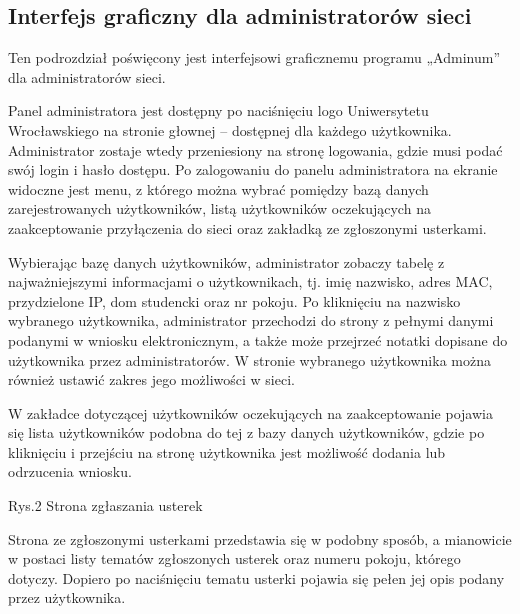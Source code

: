 \documentclass[12pt,a4paper,notitlepage]{article}
\begin{document}
   \subsection{Interfejs graficzny dla administratorów sieci}
Ten podrozdział poświęcony jest interfejsowi graficznemu programu „Adminum” dla administratorów sieci.

Panel administratora jest dostępny po naciśnięciu logo Uniwersytetu Wrocławskiego na stronie głownej – dostępnej dla każdego użytkownika. Administrator zostaje wtedy przeniesiony na stronę logowania, gdzie musi podać swój login i hasło dostępu. Po zalogowaniu do panelu administratora na ekranie widoczne jest menu, z którego można wybrać pomiędzy bazą danych zarejestrowanych użytkowników, listą użytkowników oczekujących na zaakceptowanie przyłączenia do sieci oraz zakładką ze zgłoszonymi usterkami.

Wybierając bazę danych użytkowników, administrator zobaczy tabelę z najważniejszymi informacjami o użytkownikach, tj. imię nazwisko, adres MAC, przydzielone IP, dom studencki oraz nr pokoju. Po kliknięciu na nazwisko wybranego użytkownika, administrator przechodzi do strony z pełnymi danymi podanymi w wniosku elektronicznym, a także może przejrzeć notatki dopisane do użytkownika przez administratorów. W stronie wybranego użytkownika można również ustawić zakres jego możliwości w sieci.

W zakładce dotyczącej użytkowników oczekujących na zaakceptowanie pojawia się lista użytkowników podobna do tej z bazy danych użytkowników, gdzie po kliknięciu i przejściu na stronę użytkownika jest możliwość dodania lub odrzucenia wniosku.

\begin{center}Rys.2 Strona zgłaszania usterek \end{center}

Strona ze zgłoszonymi usterkami przedstawia się w podobny sposób, a mianowicie w postaci listy tematów zgłoszonych usterek oraz numeru pokoju, którego dotyczy. Dopiero po naciśnięciu tematu usterki pojawia się pełen jej opis podany przez użytkownika.
\end{document}
